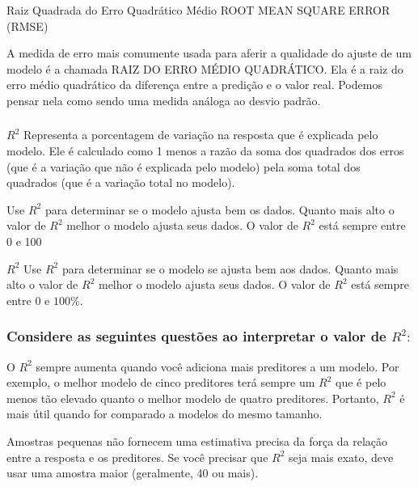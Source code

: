 \documentclass[14pt,aspectratio=1610]{beamer}
\begin{document}
\begin{frame}{}
\frametitle{ }
\begin{block}{Raiz Quadrada do Erro Quadrático Médio}
\justifying
ROOT MEAN SQUARE ERROR (RMSE)

A medida de erro mais comumente usada para aferir a qualidade do ajuste de um modelo é a chamada RAIZ DO ERRO MÉDIO QUADRÁTICO. Ela é a raiz do erro médio quadrático da diferença entre a predição e o valor real. Podemos pensar nela como sendo uma medida análoga ao desvio padrão.
 
\end{block}
\end{frame}

\begin{frame}{}
\frametitle{ }
\begin{block}{$R^2$}
\justifying
Representa a porcentagem de variação na resposta que é explicada pelo modelo. Ele é calculado como 1 menos a razão da soma dos quadrados dos erros (que é a variação que não é explicada pelo modelo) pela soma total dos quadrados (que é a variação total no modelo). 

Use $R^{2}$ para determinar se o modelo ajusta bem os dados. Quanto mais alto o valor de $R^{2}$ melhor o modelo ajusta seus dados. O valor de $R^{2}$ está sempre entre 0 e 100%
\end{block}\pause
\begin{block}{$R^2$}
\justifying
Use $R^{2}$ para determinar se o modelo se ajusta bem aos dados. Quanto mais alto o valor de $R^{2}$ melhor o modelo ajusta seus dados. O valor de $R^{2}$ está sempre entre 0 e $100\%.$
\end{block}
\end{frame}


\begin{frame}{}
\frametitle{Considere as seguintes questões ao interpretar o valor de $R^{2}:$}
\begin{block}{}
\justifying
O $R^{2}$ sempre aumenta quando você adiciona mais preditores a um modelo. Por exemplo, o melhor modelo de cinco preditores terá sempre um $R^{2}$ que é pelo menos tão elevado quanto o melhor modelo de quatro preditores. Portanto, $R^{2}$ é mais útil quando for comparado a modelos do mesmo tamanho. 
\end{block}\pause
\begin{block}{}
\justifying
Amostras pequenas não fornecem uma estimativa precisa da força da relação entre a resposta e os preditores. Se você precisar que $R^{2}$ seja mais exato, deve usar uma amostra maior (geralmente, 40 ou mais). 
\end{block}
\end{frame}
\end{document}
